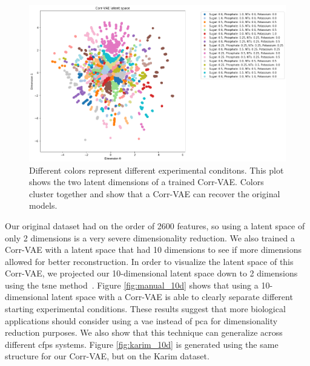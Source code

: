 \begin{figure}[t!]
\begin{center}
\includegraphics[width=1.01\textwidth]{figs/corrvae_hand_2d_latent.png}
\caption[Latent dimensions of our Corr-VAE network]{Different colors represent different experimental conditons.
This plot shows the two latent dimensions of a trained Corr-VAE.
Colors cluster together and show that a Corr-VAE can recover the original models.}
\label{fig:corrvae_2d}
\end{center}
\end{figure}

Our original dataset had on the order of 2600 features, so using a latent space of only 2 dimensions is a very severe dimensionality reduction.
We also trained a Corr-VAE with a latent space that had 10 dimensions to see if more dimensions allowed for better reconstruction.
In order to visualize the latent space of this Corr-VAE, we projected our 10-dimensional latent space down to 2 dimensions using the \gls{tsne} method~\cite{maaten2008visualizing}.
Figure \ref{fig:manual_10d} shows that using a 10-dimensional latent space with a Corr-VAE is able to clearly separate different starting experimental conditions.
These results suggest that more biological applications should consider using a \gls{vae} instead of \gls{pca} for dimensionality reduction purposes.
We also show that this technique can generalize across different \gls{cfps} systems.
Figure \ref{fig:karim_10d} is generated using the same structure for our Corr-VAE, but on the Karim dataset.

